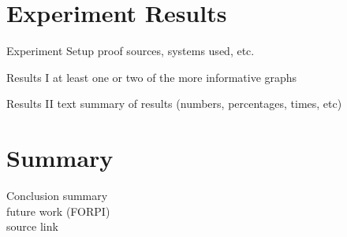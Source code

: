 \documentclass{beamer}
\begin{document}
\section{Experiment Results}

\begin{frame}{Experiment Setup}
proof sources, systems used, etc.
\end{frame}

\begin{frame}{Results I}
at least one or two of the more informative graphs
\end{frame}

\begin{frame}{Results II}
text summary of results (numbers, percentages, times, etc)
\end{frame}

\section*{Summary}

\begin{frame}{Conclusion}
summary\\
future work (FORPI)\\
source link\\
\end{frame}
\end{document}
